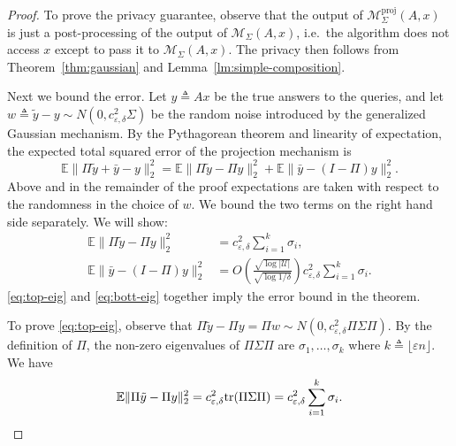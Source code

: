 \documentclass{article}
\def\tr{{\rm tr}} \def\rank{{\rm rank}}
\newcommand{\alg}{\mathcal{M}}
\newcommand{\eps}{\varepsilon}
\newcommand{\E}{\mathbb{E}}
\newcommand{\univ}{U}
\renewcommand{\univ}{\mathcal{U}}
\begin{document}
\begin{proof} 
  To prove the privacy guarantee, observe that the output of
  $\alg_\Sigma^{\text{proj}}(A,x)$ is just a post-processing of the
  output of $\alg_\Sigma(A,x)$, i.e.~the algorithm does not access $x$
  except to pass it to $\alg_\Sigma(A,x)$. The privacy then follows
  from Theorem~\ref{thm:gaussian} and
  Lemma~\ref{lm:simple-composition}.

  Next we bound the error. Let $y\triangleq Ax$ be the true answers to
  the queries, and let $w \triangleq \tilde{y} - y \sim N(0, c_{\eps,
    \delta}^2\Sigma)$ be the random noise introduced by the
  generalized Gaussian mechanism.  By the Pythagorean theorem and
  linearity of expectation, the expected total squared error of the
  projection mechanism is
  \[
  \E\|\Pi \tilde{y} + \bar{y} - y\|_2^2 =   \E\|\Pi \tilde{y}  - \Pi
  y\|_2^2 +\E \|\bar{y} - (I-\Pi) y\|_2^2.
  \]
  Above and in the remainder of the proof expectations are taken
  with respect to the randomness in the choice of $w$.  We bound the
  two terms on the right hand side separately. We will show:
  \begin{align}
    \label{eq:top-eig}
    \E\|\Pi \tilde{y}  - \Pi  y\|_2^2 &=   c_{\eps, \delta}^2\sum_{i =
      1}^k{\sigma_i},\\
    \label{eq:bott-eig}
    \E \|\bar{y} - (I-\Pi) y\|_2^2 &= O\left(\frac{\sqrt{\log
          |\univ|}}{\sqrt{\log 1/\delta}}\right)c_{\eps, \delta}^2\sum_{i =
      1}^k{\sigma_i}.
  \end{align}
  \eqref{eq:top-eig} and \eqref{eq:bott-eig} together imply the error
  bound in the theorem.

  To prove \eqref{eq:top-eig}, observe that $\Pi\tilde{y} - \Pi y =
  \Pi w \sim N(0, c_{\eps,\delta}^2\Pi \Sigma \Pi)$. By the definition of $\Pi$, the
  non-zero eigenvalues of $\Pi \Sigma\Pi$ are $\sigma_1, \ldots,
  \sigma_{k}$ where $k \triangleq \lfloor \eps n\rfloor$. We have
  \[
  \E \|\Pi\tilde{y} - \Pi y\|_2^2 = c_{\eps, \delta}^2\tr(\Pi \Sigma \Pi) =
  c_{\eps, \delta}^2\sum_{i = 1}^k{\sigma_i}.
  \]


\end{proof}
\end{document}
